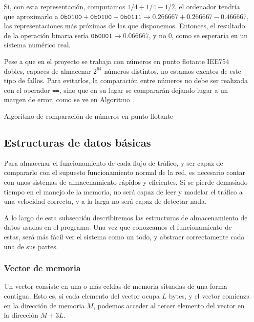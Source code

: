 Si, con esta representación, computamos $1/4+1/4-1/2$, el ordenador tendría que aproximarlo a 
$\mathtt{0b0100}+\mathtt{0b0100}-\mathtt{0b0111} \rightarrow 0.266667+0.266667-0.466667$, las representaciones más 
próximas de las que disponemos. Entonces, el resultado de la operación binaria sería $\mathtt{0b0001} \rightarrow 
0.066667$, y no $0$, como se esperaría en un sistema numérico real.

Pese a que en el proyecto se trabaja con números en punto flotante IEE754 dobles, capaces de almacenar $2^64$ números 
distintos, no estamos exentos de este tipo de fallos. Para evitarlos, la comparación entre números no debe ser 
realizada con el operador \texttt{==}, sino que en su lugar se compararán dejando lugar a un margen de error, como se 
ve en Algoritmo .

\begin{algorithm}
 \caption{Algoritmo de comparación de números en punto flotante}
\end{algorithm}

\subsection{Estructuras de datos básicas}
Para almacenar el funcionamiento de cada flujo de tráfico, y ser capaz de compararlo con el supuesto funcionamiento 
normal de la red, es necesario contar con unos sistemas de almacenamiento rápidos y eficientes. Si se pierde demasiado 
tiempo en el manejo de la memoria, \redborderddos{} no será capaz de leer y modelar el tráfico a una velocidad 
correcta, y a la larga no será capaz de detectar nada.

A lo largo de esta subsección describiremos las estructuras de almacenamiento de datos usadas en el programa. Una vez 
que conozcamos el funcionamiento de estas, será más fácil ver el sistema como un todo, y abstraer correctamente cada 
una de sus partes.

\subsubsection{Vector de memoria}
Un vector consiste en una o más celdas de memoria situadas de una forma contigua. Esto es, si cada elemento del vector 
ocupa $L$ bytes, y el vector comienza en la dirección de memoria $M$, podemos acceder al tercer elemento del vector en 
la dirección $M+3L$.

